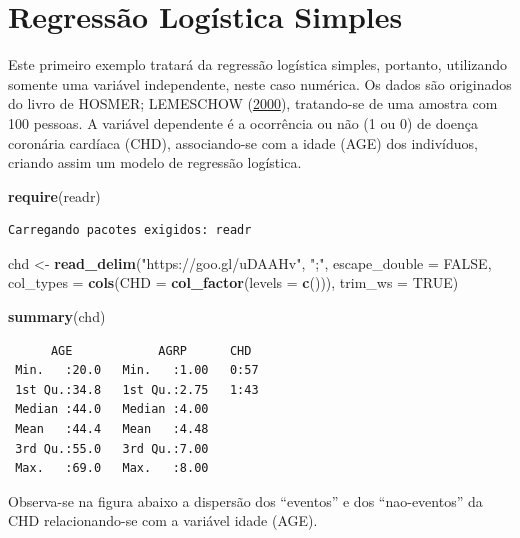 \documentclass[12pt,brazil,oneside]{book}
\newenvironment{Shaded}{\begin{snugshade}}{\end{snugshade}}
\newcommand{\DataTypeTok}[1]{\textcolor[rgb]{0.13,0.29,0.53}{#1}}
\newcommand{\KeywordTok}[1]{\textcolor[rgb]{0.13,0.29,0.53}{\textbf{#1}}}
\newcommand{\NormalTok}[1]{#1}
\newcommand{\OtherTok}[1]{\textcolor[rgb]{0.56,0.35,0.01}{#1}}
\newcommand{\StringTok}[1]{\textcolor[rgb]{0.31,0.60,0.02}{#1}}
\begin{document}
\hypertarget{regressao-logistica-simples}{%
\section{Regressão Logística
Simples}\label{regressao-logistica-simples}}

Este primeiro exemplo tratará da regressão logística simples, portanto,
utilizando somente uma variável independente, neste caso numérica. Os
dados são originados do livro de HOSMER; LEMESCHOW
(\protect\hyperlink{ref-Hosmer2000}{2000}), tratando-se de uma amostra
com 100 pessoas. A variável dependente é a ocorrência ou não (1 ou 0) de
doença coronária cardíaca (CHD), associando-se com a idade (AGE) dos
indivíduos, criando assim um modelo de regressão logística.

\begin{Shaded}
\begin{Highlighting}[]
\KeywordTok{require}\NormalTok{(readr)}
\end{Highlighting}
\end{Shaded}

\begin{verbatim}
Carregando pacotes exigidos: readr
\end{verbatim}

\begin{Shaded}
\begin{Highlighting}[]
\NormalTok{chd <-}\StringTok{ }\KeywordTok{read_delim}\NormalTok{(}\StringTok{"https://goo.gl/uDAAHv"}\NormalTok{, }
    \StringTok{";"}\NormalTok{, }\DataTypeTok{escape_double =} \OtherTok{FALSE}\NormalTok{, }\DataTypeTok{col_types =} \KeywordTok{cols}\NormalTok{(}\DataTypeTok{CHD =} \KeywordTok{col_factor}\NormalTok{(}\DataTypeTok{levels =} \KeywordTok{c}\NormalTok{())), }
    \DataTypeTok{trim_ws =} \OtherTok{TRUE}\NormalTok{)}

\KeywordTok{summary}\NormalTok{(chd)}
\end{Highlighting}
\end{Shaded}

\begin{verbatim}
      AGE            AGRP      CHD   
 Min.   :20.0   Min.   :1.00   0:57  
 1st Qu.:34.8   1st Qu.:2.75   1:43  
 Median :44.0   Median :4.00         
 Mean   :44.4   Mean   :4.48         
 3rd Qu.:55.0   3rd Qu.:7.00         
 Max.   :69.0   Max.   :8.00         
\end{verbatim}

Observa-se na figura abaixo a dispersão dos ``eventos'' e dos
``nao-eventos'' da CHD relacionando-se com a variável idade (AGE).
\end{document}
